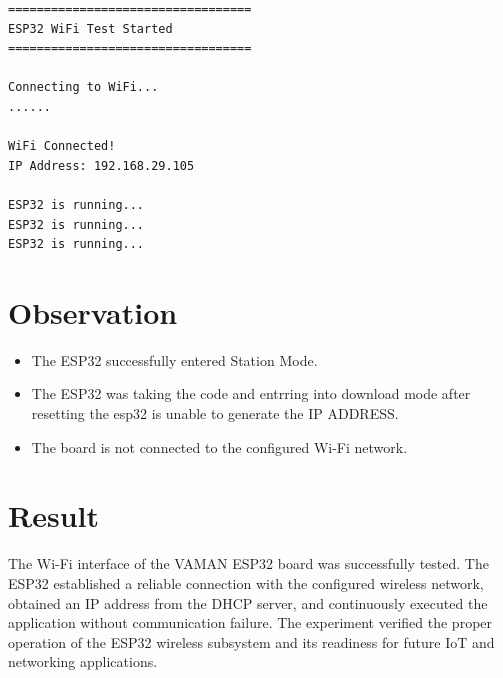 \documentclass[12pt]{article}
\begin{document}
\begin{verbatim}
==================================
ESP32 WiFi Test Started
==================================

Connecting to WiFi...
......

WiFi Connected!
IP Address: 192.168.29.105

ESP32 is running...
ESP32 is running...
ESP32 is running...
\end{verbatim}

\section{Observation}

\begin{itemize}
    \item The ESP32 successfully entered Station Mode.
    \item The ESP32 was taking the code and entrring into download mode after resetting the esp32 is unable to generate the IP ADDRESS.
    \item The board is not  connected to the configured Wi-Fi network.

\end{itemize}

\section{Result}

The Wi-Fi interface of the VAMAN ESP32 board was successfully tested. The ESP32 established a reliable connection with the configured wireless network, obtained an IP address from the DHCP server, and continuously executed the application without communication failure. The experiment verified the proper operation of the ESP32 wireless subsystem and its readiness for future IoT and networking applications.
\end{document}
